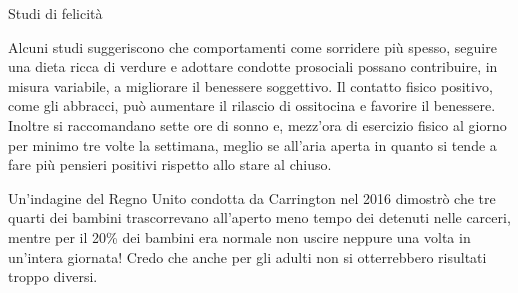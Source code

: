 \documentclass[12pt]{book} %
\begin{document}
\begin{mdframed}[linewidth=1pt]
Studi di felicità 

Alcuni studi suggeriscono che comportamenti come sorridere più spesso, seguire una dieta ricca di verdure e adottare condotte prosociali possano contribuire, in misura variabile, a migliorare il benessere soggettivo. Il contatto fisico positivo, come gli abbracci, può aumentare il rilascio di ossitocina e favorire il benessere. Inoltre si raccomandano sette ore di
sonno e, mezz'ora di esercizio fisico al giorno per minimo tre volte la settimana, meglio se
all'aria aperta in quanto si tende a fare più pensieri positivi rispetto allo stare al
chiuso.

Un'indagine del Regno Unito condotta da Carrington nel 2016 dimostrò che tre quarti dei bambini
trascorrevano all'aperto meno tempo dei detenuti nelle carceri, mentre per il 20\% dei bambini era
normale non uscire neppure una volta in un'intera giornata! Credo che anche per gli adulti non si
otterrebbero risultati troppo diversi.


\end{mdframed}
\end{document}

